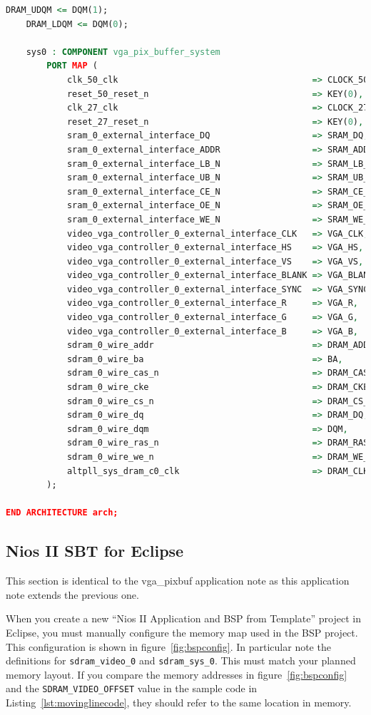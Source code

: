 \documentclass{capstonedoc}
\begin{document}
\begin{lstlisting}[language=vhdl,caption={Sample Top Level VHDL File},label={lst:toplevel},tabsize=1]
	DRAM_UDQM <= DQM(1);
	DRAM_LDQM <= DQM(0);

	sys0 : COMPONENT vga_pix_buffer_system
		PORT MAP (
			clk_50_clk                                      => CLOCK_50,
			reset_50_reset_n                                => KEY(0),
			clk_27_clk                                      => CLOCK_27,
			reset_27_reset_n                                => KEY(0),
			sram_0_external_interface_DQ                    => SRAM_DQ,
			sram_0_external_interface_ADDR                  => SRAM_ADDR,
			sram_0_external_interface_LB_N                  => SRAM_LB_N,
			sram_0_external_interface_UB_N                  => SRAM_UB_N,
			sram_0_external_interface_CE_N                  => SRAM_CE_N,
			sram_0_external_interface_OE_N                  => SRAM_OE_N,
			sram_0_external_interface_WE_N                  => SRAM_WE_N,
			video_vga_controller_0_external_interface_CLK   => VGA_CLK,
			video_vga_controller_0_external_interface_HS    => VGA_HS,
			video_vga_controller_0_external_interface_VS    => VGA_VS,
			video_vga_controller_0_external_interface_BLANK => VGA_BLANK,
			video_vga_controller_0_external_interface_SYNC  => VGA_SYNC,
			video_vga_controller_0_external_interface_R     => VGA_R,
			video_vga_controller_0_external_interface_G     => VGA_G,
			video_vga_controller_0_external_interface_B     => VGA_B,
			sdram_0_wire_addr                               => DRAM_ADDR,
			sdram_0_wire_ba                                 => BA,
			sdram_0_wire_cas_n                              => DRAM_CAS_N,
			sdram_0_wire_cke                                => DRAM_CKE,
			sdram_0_wire_cs_n                               => DRAM_CS_N,
			sdram_0_wire_dq                                 => DRAM_DQ,
			sdram_0_wire_dqm                                => DQM,
			sdram_0_wire_ras_n                              => DRAM_RAS_N,
			sdram_0_wire_we_n                               => DRAM_WE_N,
			altpll_sys_dram_c0_clk                          => DRAM_CLK
		);

END ARCHITECTURE arch;
\end{lstlisting}

\subsection{Nios II SBT for Eclipse}

This section is identical to the vga_pixbuf application note as this application
note extends the previous one.

When you create a new ``Nios II Application and BSP from Template'' project in
Eclipse, you must manually configure the memory map used in the BSP project.
This configuration is shown in figure~\ref{fig:bspconfig}. In particular note
the definitions for \texttt{sdram\_video\_0} and \texttt{sdram\_sys\_0}. This
must match your planned memory layout. If you compare the memory addresses in
figure~\ref{fig:bspconfig} and the \texttt{SDRAM\_VIDEO\_OFFSET} value in the
sample code in Listing~\ref{lst:movinglinecode}, they should refer to the same
location in memory.
\end{document}
